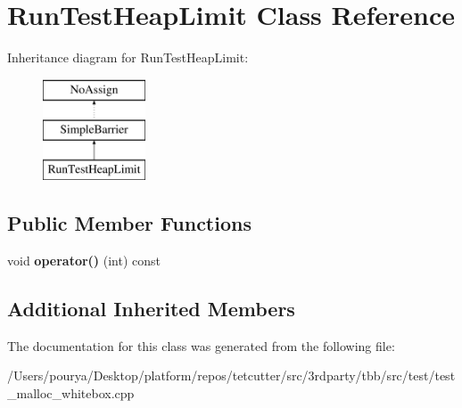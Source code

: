 \hypertarget{classRunTestHeapLimit}{}\section{Run\+Test\+Heap\+Limit Class Reference}
\label{classRunTestHeapLimit}
Inheritance diagram for Run\+Test\+Heap\+Limit\+:\begin{figure}[H]
\begin{center}
\leavevmode
\includegraphics[height=3.000000cm]{classRunTestHeapLimit}
\end{center}
\end{figure}
\subsection*{Public Member Functions}
\begin{DoxyCompactItemize}
\item 
\hypertarget{classRunTestHeapLimit_a645d688689682375ac464a6dc712362b}{}void {\bfseries operator()} (int) const \label{classRunTestHeapLimit_a645d688689682375ac464a6dc712362b}

\end{DoxyCompactItemize}
\subsection*{Additional Inherited Members}


The documentation for this class was generated from the following file\+:\begin{DoxyCompactItemize}
\item 
/\+Users/pourya/\+Desktop/platform/repos/tetcutter/src/3rdparty/tbb/src/test/test\+\_\+malloc\+\_\+whitebox.\+cpp\end{DoxyCompactItemize}
